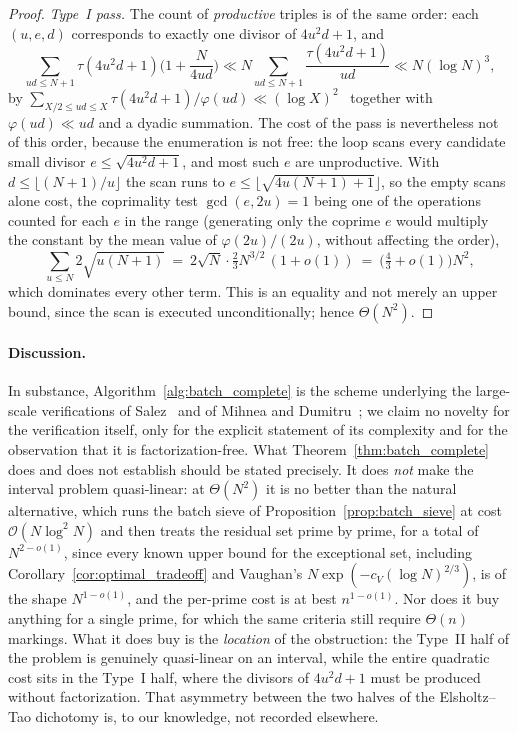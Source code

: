 \documentclass[11pt, a4paper]{article}
\theoremstyle{plain}
\theoremstyle{definition}
\begin{document}
\begin{proof}
\emph{Type~I pass.} The count of \emph{productive} triples is of the same order: each $(u,e,d)$ corresponds to exactly one divisor of $4u^{2}d+1$, and
$$\sum_{ud\le N+1}\tau(4u^{2}d+1)\Big(1+\frac{N}{4ud}\Big)\ll N\sum_{ud\le N+1}\frac{\tau(4u^{2}d+1)}{ud}\ll N(\log N)^{3},$$
by $\sum_{X/2\le ud\le X}\tau(4u^{2}d+1)/\varphi(ud)\ll(\log X)^{2}$~\cite[(3.3)]{pomerance2026} together with $\varphi(ud)\ll ud$ and a dyadic summation. The cost of the pass is nevertheless not of this order, because the enumeration is not free: the loop scans every candidate small divisor $e\le\sqrt{4u^{2}d+1}$, and most such $e$ are unproductive. With $d\le\lfloor(N+1)/u\rfloor$ the scan runs to $e\le \lfloor\sqrt{4u(N+1)+1}\rfloor$, so the empty scans alone cost, the coprimality test $\gcd(e,2u)=1$ being one of the operations counted for each $e$ in the range (generating only the coprime $e$ would multiply the constant by the mean value of $\varphi(2u)/(2u)$, without affecting the order),
$$\sum_{u\le N}2\sqrt{u(N+1)}\ =\ 2\sqrt N\cdot\tfrac23N^{3/2}\,(1+o(1))\ =\ \big(\tfrac43+o(1)\big)N^{2},$$
which dominates every other term. This is an equality and not merely an upper bound, since the scan is executed unconditionally; hence $\Theta(N^{2})$.
\end{proof}

\paragraph{Discussion.} In substance, Algorithm~\ref{alg:batch_complete} is the scheme underlying the large-scale verifications of Salez~\cite{salez2014} and of Mihnea and Dumitru~\cite{mihnea2025}; we claim no novelty for the verification itself, only for the explicit statement of its complexity and for the observation that it is factorization-free. What Theorem~\ref{thm:batch_complete} does and does not establish should be stated precisely. It does \emph{not} make the interval problem quasi-linear: at $\Theta(N^{2})$ it is no better than the natural alternative, which runs the batch sieve of Proposition~\ref{prop:batch_sieve} at cost $\mathcal{O}(N\log^{2}N)$ and then treats the residual set prime by prime, for a total of $N^{2-o(1)}$, since every known upper bound for the exceptional set, including Corollary~\ref{cor:optimal_tradeoff} and Vaughan's $N\exp(-c_V(\log N)^{2/3})$, is of the shape $N^{1-o(1)}$, and the per-prime cost is at best $n^{1-o(1)}$. Nor does it buy anything for a single prime, for which the same criteria still require $\Theta(n)$ markings. What it does buy is the \emph{location} of the obstruction: the Type~II half of the problem is genuinely quasi-linear on an interval, while the entire quadratic cost sits in the Type~I half, where the divisors of $4u^{2}d+1$ must be produced without factorization. That asymmetry between the two halves of the Elsholtz--Tao dichotomy is, to our knowledge, not recorded elsewhere.
\end{document}
